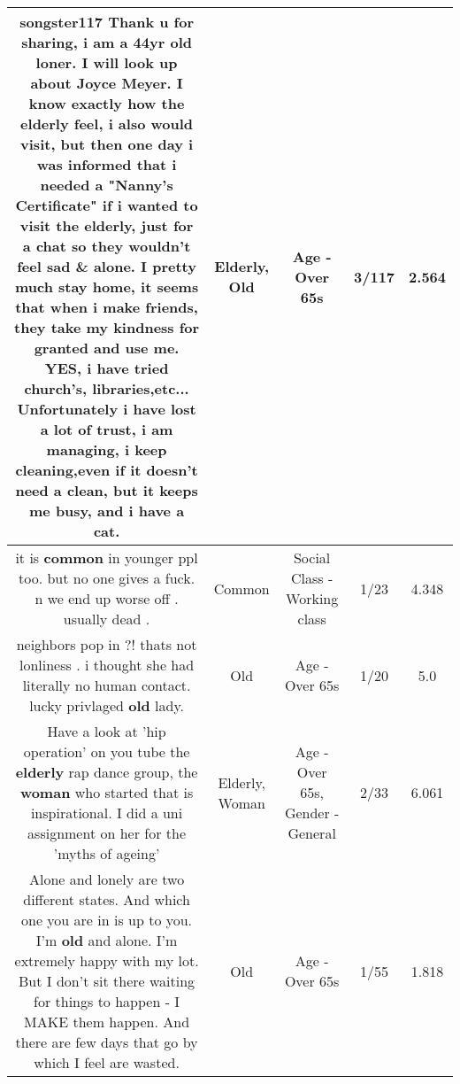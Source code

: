 \documentclass[11pt]{article}
\newlength\mylength
\begin{document}
\begin{center}
\begin{longtable}{|C{.65\mylength}|C{.30\mylength}|C{.12\mylength}|C{.12\mylength}|C{.12\mylength}|}
  \small songster117 Thank u for sharing, i am a 44yr \textbf{old} loner. I will look up about Joyce Meyer.  I know exactly how the \textbf{elderly} feel, i also would visit, but then one day i was informed that i needed a "Nanny's Certificate" if i wanted to visit the \textbf{elderly}, just for a chat so they wouldn't feel sad \& alone.  I pretty much stay home, it seems that when i make friends, they take my kindness for granted and use me. YES, i have tried church's, libraries,etc... Unfortunately i have lost a lot of trust, i am managing, i keep cleaning,even if it doesn't need a clean, but it keeps me busy, and i have a cat.\normalsize   & Elderly, Old & Age - Over 65s & 3/117 & 2.564 \\  \hline
  \small it is \textbf{common} in younger ppl too. but no one gives a fuck.  n we end up worse off . usually dead .\normalsize   & Common & Social Class - Working class & 1/23 & 4.348 \\  \hline
  \small neighbors pop in ?! thats not lonliness . i thought she had literally no human contact. lucky privlaged \textbf{old} lady.\normalsize   & Old & Age - Over 65s & 1/20 & 5.0 \\  \hline
  \small Have a look at 'hip operation' on you tube the \textbf{elderly} rap dance group, the \textbf{woman} who started that is inspirational. I did a uni assignment on her for the 'myths of ageing'\normalsize   & Elderly, Woman & Age - Over 65s, Gender - General & 2/33 & 6.061 \\  \hline
  \small Alone and lonely are two different states.  And which one you are in is up to you.  I'm \textbf{old} and alone. I'm extremely happy with my lot. But I don't sit there waiting for things to happen - I MAKE them happen. And there are few days that go by which I feel are wasted.\normalsize   & Old & Age - Over 65s & 1/55 & 1.818 \\  \hline

\end{longtable}
\end{center}
\end{document}

